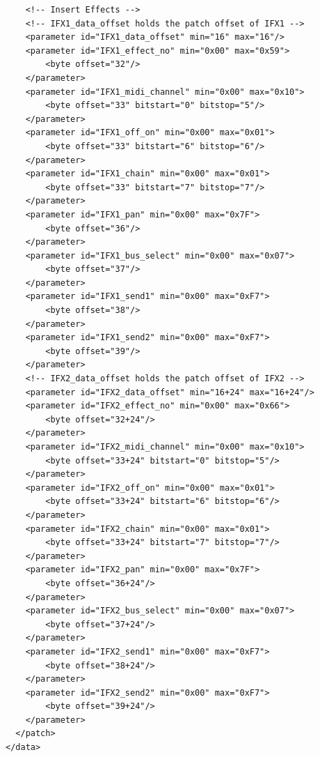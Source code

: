 \documentclass[a4paper,twoside,12pt]{article}
\begin{document}
\begin{verbatim}
    <!-- Insert Effects -->
    <!-- IFX1_data_offset holds the patch offset of IFX1 -->
    <parameter id="IFX1_data_offset" min="16" max="16"/>
    <parameter id="IFX1_effect_no" min="0x00" max="0x59">
        <byte offset="32"/>
    </parameter>
    <parameter id="IFX1_midi_channel" min="0x00" max="0x10">
        <byte offset="33" bitstart="0" bitstop="5"/>
    </parameter>
    <parameter id="IFX1_off_on" min="0x00" max="0x01">
        <byte offset="33" bitstart="6" bitstop="6"/>
    </parameter>
    <parameter id="IFX1_chain" min="0x00" max="0x01">
        <byte offset="33" bitstart="7" bitstop="7"/>
    </parameter>
    <parameter id="IFX1_pan" min="0x00" max="0x7F">
        <byte offset="36"/>
    </parameter>
    <parameter id="IFX1_bus_select" min="0x00" max="0x07">
        <byte offset="37"/>
    </parameter>
    <parameter id="IFX1_send1" min="0x00" max="0xF7">
        <byte offset="38"/>
    </parameter>
    <parameter id="IFX1_send2" min="0x00" max="0xF7">
        <byte offset="39"/>
    </parameter>
    <!-- IFX2_data_offset holds the patch offset of IFX2 -->
    <parameter id="IFX2_data_offset" min="16+24" max="16+24"/>
    <parameter id="IFX2_effect_no" min="0x00" max="0x66">
        <byte offset="32+24"/>
    </parameter>
    <parameter id="IFX2_midi_channel" min="0x00" max="0x10">
        <byte offset="33+24" bitstart="0" bitstop="5"/>
    </parameter>
    <parameter id="IFX2_off_on" min="0x00" max="0x01">
        <byte offset="33+24" bitstart="6" bitstop="6"/>
    </parameter>
    <parameter id="IFX2_chain" min="0x00" max="0x01">
        <byte offset="33+24" bitstart="7" bitstop="7"/>
    </parameter>
    <parameter id="IFX2_pan" min="0x00" max="0x7F">
        <byte offset="36+24"/>
    </parameter>
    <parameter id="IFX2_bus_select" min="0x00" max="0x07">
        <byte offset="37+24"/>
    </parameter>
    <parameter id="IFX2_send1" min="0x00" max="0xF7">
        <byte offset="38+24"/>
    </parameter>
    <parameter id="IFX2_send2" min="0x00" max="0xF7">
        <byte offset="39+24"/>
    </parameter>
  </patch>
</data>
\end{verbatim}
\end{document}
